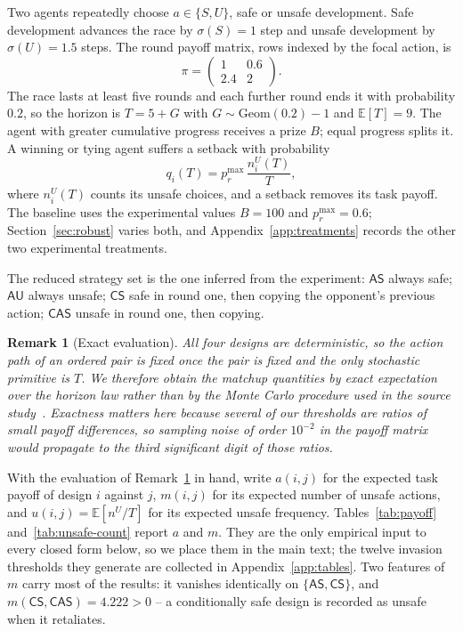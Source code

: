 \documentclass[pdflatex]{sn-jnl}
\theoremstyle{thmstyleone}
\theoremstyle{thmstylethree}
\theoremstyle{thmstyletwo}
\newtheorem{remark}{Remark}
\newcommand{\AS}{\textsf{AS}}
\newcommand{\AU}{\textsf{AU}}
\newcommand{\CS}{\textsf{CS}}
\newcommand{\CAS}{\textsf{CAS}}
\begin{document}
Two agents repeatedly choose $a\in\{S,U\}$, safe or unsafe development. Safe
development advances the race by $\sigma(S)=1$ step and unsafe development by
$\sigma(U)=1.5$ steps. The round payoff matrix, rows indexed by the focal
action, is
\begin{equation}
\pi=\begin{pmatrix} 1 & 0.6\\ 2.4 & 2\end{pmatrix}.
\label{eq:stage}
\end{equation}
The race lasts at least five rounds and each further round ends it with
probability $0.2$, so the horizon is $T=5+G$ with $G\sim\mathrm{Geom}(0.2)-1$
and $\mathbb{E}[T]=9$. The agent with greater cumulative progress receives a
prize $B$; equal progress splits it. A winning or tying agent suffers a
setback with probability
\begin{equation}
q_i(T)=p_r^{\max}\,\frac{n_i^{U}(T)}{T},
\label{eq:risk}
\end{equation}
where $n^{U}_i(T)$ counts its unsafe choices, and a setback removes its task
payoff. The baseline uses the experimental values $B=100$ and
$p_r^{\max}=0.6$; Section~\ref{sec:robust} varies both, and
Appendix~\ref{app:treatments} records the other two experimental treatments.

The reduced strategy set is the one inferred from the experiment: $\AS$ always
safe; $\AU$ always unsafe; $\CS$ safe in round one, then copying the
opponent's previous action; $\CAS$ unsafe in round one, then copying.

\begin{remark}[Exact evaluation]\label{rem:exact}
All four designs are deterministic, so the action path of an ordered pair is
fixed once the pair is fixed and the only stochastic primitive is $T$. We
therefore obtain the matchup quantities by exact expectation over the horizon
law rather than by the Monte Carlo procedure used in the source study~\citep{domingos2026falling}. Exactness matters here because several of our
thresholds are ratios of small payoff differences, so sampling noise of order
$10^{-2}$ in the payoff matrix would propagate to the third significant digit
of those ratios.
\end{remark}

With the evaluation of Remark~\ref{rem:exact} in hand, write $a(i,j)$ for the
expected task payoff of design $i$ against $j$,
$m(i,j)$ for its expected number of unsafe actions, and
$u(i,j)=\mathbb{E}[n^{U}/T]$ for its expected unsafe frequency.
Tables~\ref{tab:payoff} and~\ref{tab:unsafe-count} report $a$ and $m$. They
are the only empirical input to every closed form below, so we place them in
the main text; the twelve invasion thresholds they generate are collected in
Appendix~\ref{app:tables}. Two features of $m$ carry most of the results: it
vanishes identically on $\{\AS,\CS\}$, and $m(\CS,\CAS)=4.222>0$ -- a
conditionally safe design is recorded as unsafe when it retaliates.
\end{document}

